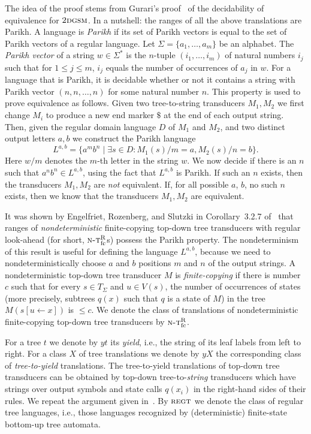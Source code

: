 \documentclass[copyright,creativecommons]{eptcs}
\newcommand{\ntrfc}{\textsc{n-t}^{\text{R}}_{\text{fc}}}
\newcommand{\dgsm}{\textsc{2dgsm}}
\newcommand{\regt}{\textsc{regt}}
\begin{document}
The idea of the proof stems from Gurari's proof~\cite{DBLP:journals/siamcomp/Gurari82} of
the decidability of equivalence for $\dgsm$.
In a nutshell: the ranges of all the above translations are Parikh.
A language is \emph{Parikh} if its set of Parikh vectors is equal to the
set of Parikh vectors of a regular language. 
Let $\Sigma=\{a_1,\dots,a_m\}$ be an alphabet.
The \emph{Parikh vector} of a string $w\in\Sigma^*$ 
is the $n$-tuple $(i_1,\dots,i_m)$ of natural numbers $i_j$ such that
for $1\leq j\leq m$, $i_j$ equals the number of occurrences of $a_j$ in $w$.
For a language that is Parikh, it is decidable whether or not it contains
a string with Parikh vector $(n,n,\dots,n)$ for some natural number $n$.
This property is used to prove equivalence as follows.
Given two tree-to-string transducers $M_1, M_2$ we first change $M_i$ to 
produce a new end marker $\$$ at the end of each output string. 
Then, given the regular domain language $D$ of $M_1$ and $M_2$,
and two distinct output letters $a,b$
we construct the Parikh language
\[
L^{a,b}=\{a^mb^n\mid \exists s\in D: M_1(s)/m=a, M_2(s)/n=b\}.
\]
Here $w/m$ denotes the $m$-th letter in the string $w$.
We now decide if there is an $n$ such that $a^nb^n\in L^{a,b}$, using the fact that $L^{a,b}$ is Parikh.
If such an $n$ exists, then the transducers $M_1, M_2$ are \emph{not} equivalent.
If, for all possible $a$, $b$, no such $n$ exists, then we know
that the transducers $M_1, M_2$ are equivalent.

It was shown by Engelfriet, Rozenberg, and Slutzki
in Corollary~3.2.7 of~\cite{DBLP:journals/jcss/EngelfrietRS80}
that ranges of \emph{nondeterministic} finite-copying top-down
tree transducers with regular look-ahead (for short, $\ntrfc$s) possess the Parikh property.
The nondeterminism of this result is useful for defining
the language $L^{a,b}$, because we need to nondeterministically choose $a$ and
$b$ positions $m$ and $n$ of the output strings. 
A nondeterministic top-down tree transducer $M$ is \emph{finite-copying}
if there is number $c$ such that for every $s\in T_\Sigma$ and $u\in V(s)$,
the number of occurrences of states (more precisely, subtrees $q(x)$ such
that $q$ is a state of $M$)
in the tree $M(s[u\leftarrow x])$ is $\leq c$.
We denote the class of translations of nondeterministic finite-copying
top-down tree transducers by $\ntrfc$.

For a tree $t$ we denote by $yt$ its \emph{yield}, i.e., 
the string of its leaf labels from left to right.
For a class $X$ of tree translations we denote by
$yX$ the corresponding class of \emph{tree-to-yield} translations.
The tree-to-yield translations of top-down tree transducers can 
be obtained by top-down tree-to-\emph{string} transducers
which have strings over output symbols and state calls $q(x_i)$ 
in the right-hand sides of their rules.
We repeat the argument given in~\cite{DBLP:journals/jcss/EngelfrietRS80}.
By $\regt$ we denote the class of regular tree languages, i.e.,
those languages recognized by
(deterministic) finite-state bottom-up tree automata.
\end{document}

